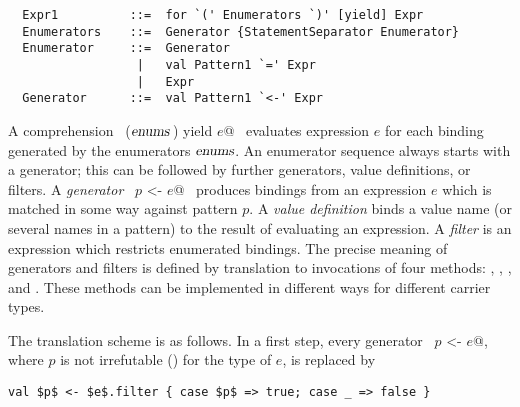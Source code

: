 \syntax\begin{lstlisting}
  Expr1          ::=  for `(' Enumerators `)' [yield] Expr
  Enumerators    ::=  Generator {StatementSeparator Enumerator}
  Enumerator     ::=  Generator 
                  |   val Pattern1 `=' Expr 
                  |   Expr
  Generator      ::=  val Pattern1 `<-' Expr
\end{lstlisting}

A comprehension ~\lstinline@for ($\mbox{\sl enums}\,$) yield $e$@~ evaluates
expression $e$ for each binding generated by the enumerators
$\mbox{\sl enums}$. An enumerator sequence always starts with a generator; this
can be followed by further generators, value definitions, or filters.
A {\em generator} ~\lstinline@val $p$ <- $e$@~ produces bindings from
an expression $e$ which is matched in some way against pattern $p$. A
{\em value definition} binds a value name (or several names in a
pattern) to the result of evaluating an expression. A {\em filter} is
an expression which restricts enumerated bindings. The precise meaning
of generators and filters is defined by translation to invocations of
four methods: , , , and
. These methods can be implemented in different ways for
different carrier types.  

The translation scheme is as follows.  In a first step, every
generator ~\lstinline@val $p$ <- $e$@, where $p$ is not irrefutable ()
for the type of $e$, is replaced by
\begin{lstlisting}
val $p$ <- $e$.filter { case $p$ => true; case _ => false }
\end{lstlisting}

